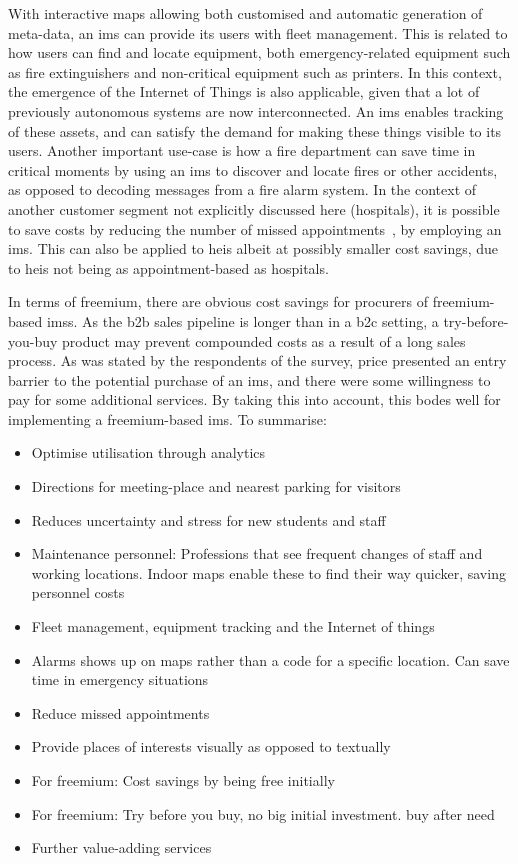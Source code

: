 With interactive maps allowing both customised and automatic generation of meta-data, an \gls{ims} can provide its users with fleet management. This is related to how users can find and locate equipment, both emergency-related equipment such as fire extinguishers and non-critical equipment such as printers. In this context, the emergence of the Internet of Things is also applicable, given that a lot of previously autonomous systems are now interconnected. An \gls{ims} enables tracking of these assets, and can satisfy the demand for making these things visible to its users.  Another important use-case is how a fire department can save time in critical moments by using an \gls{ims} to discover and locate fires or other accidents, as opposed to decoding messages from a fire alarm system. In the context of another customer segment not explicitly discussed here (hospitals), it is possible to save costs by reducing the number of missed appointments~\cite{mazemaphosp}, by employing an \gls{ims}. This can also be applied to \glspl{hei} albeit at possibly smaller cost savings, due to \glspl{hei} not being as appointment-based as hospitals.  


In terms of freemium, there are obvious cost savings for procurers of freemium-based \glspl{ims}. As the \gls{b2b} sales pipeline is longer than in a \gls{b2c} setting, a try-before-you-buy product may prevent compounded costs as a result of a long sales process. As was stated by the respondents of the survey, price presented an entry barrier to the potential purchase of an \gls{ims}, and there were some willingness to pay for some additional services. By taking this into account, this bodes well for implementing a freemium-based \gls{ims}.
To summarise:

\begin{itemize}
    \item Optimise utilisation through analytics
    \item Directions for meeting-place and nearest parking for visitors
    \item Reduces uncertainty and stress for new students and staff
    \item Maintenance personnel: Professions that see frequent changes of staff and working locations. Indoor maps enable these to find their way quicker, saving personnel costs
    \item Fleet management, equipment tracking and the Internet of things
    \item Alarms shows up on maps rather than a code for a specific location. Can save time in emergency situations
    \item Reduce missed appointments
    \item Provide places of interests visually as opposed to textually
    \item For freemium: Cost savings by being free initially
    \item For freemium: Try before you buy, no big initial investment. buy after need
    \item Further value-adding services
\end{itemize}

